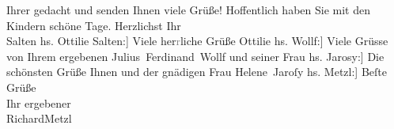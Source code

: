 \begin{ledgroupsized}[t]{13cm}
               Ihrer gedacht und senden Ihnen viele Grüße! Hoffentlich haben Sie mit den Kindern schöne Tage.
               Herzlichst Ihr {\\}\spacefill\mbox{Salten}\pend
           \pstart
           \noindent{}{[}hs. Ottilie Salten:{]} Viele her\textcolor{gray}{r}liche Grüße
                  \spacefill\mbox{Ottilie}\pend
           \pstart
           \noindent{}{[}hs. Wollf:{]} Viele Grüsse von Ihrem ergebenen\pend
           \pstart \spacefill\mbox{Julius Ferdinand Wollf} und seiner Frau\pend{}\pstart
           \noindent{}{[}hs. Jarosy:{]} Die schönsten Grüße Ihnen und der gnädigen Frau
                  \spacefill\mbox{Helene Jaroſy}\pend
           \pstart
           \noindent{}{[}hs. Metzl:{]} Beſte Grüße {\\}Ihr ergebener {\\}\spacefill\mbox{RichardMetzl}\pend
           
         
         \endnumbering{}\end{ledgroupsized}  \newcommand{\dateiname}{L03575}\newcommand{\titel}{Felix Salten u. a. an Arthur und Olga Schnitzler, [Ende Juli/August 1912?]}\newcommand{\editorInnen}{Martin Anton Müller und Laura Untner}
      